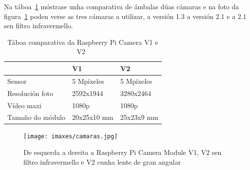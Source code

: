 Na táboa~\ref{tab:comparativa_camaras} móstrase unha comparativa de ámbalas dúas cámaras e na foto da figura~\ref{fig:camaras} poden verse as tres cámaras a utilizar, a versión 1.3 a versión 2.1 e a 2.1 sen filtro infravermello.
\begin{table}[tb]
    \label{tab:comparativa_camaras}
    \caption{Táboa comparativa da Raspberry Pi Camera V1 e V2~\cite{mocqRaspberryPiPi2017}}
    \begin{center}
        \begin{tabular}{|l|l||l|}
            \hline
              &  V1 & V2\\ \hline
             Sensor  & 5 Mpíxeles & 5 Mpíxeles \\ \hline
             Resolución foto  & 2592x1944 & 3280x2464 \\ \hline
             Vídeo maxi & 1080p & 1080p \\ \hline
             Tamaño do módulo& 20x25x10 mm & 25x23x9 mm \\ \hline
        \end{tabular}
    \end{center}
\end{table}

\begin{figure}[tb]
  \centering
  \texttt{[image: imaxes/camaras.jpg]}
  \caption{De esquerda a dereita a Raspberry Pi Camera Module V1, V2 sen filtro infravermello e V2 cunha lente de gran angular}
  \label{fig:camaras}
\end{figure}
